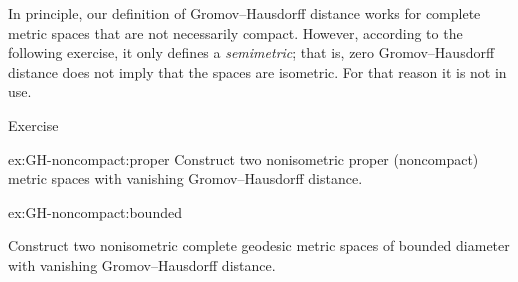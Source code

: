 In principle, our definition of Gromov--Hausdorff distance works for complete metric spaces that are not necessarily compact.
However, according to the following exercise, it only defines a \emph{semimetric}; that is, zero Gromov--Hausdorff distance does not imply that the spaces are isometric.
For that reason it is not in use.

\begin{thm}{Exercise}\label{ex:GH-noncompact}
\begin{subthm}{ex:GH-noncompact:proper}
Construct two nonisometric proper (noncompact) metric spaces with vanishing Gromov--Hausdorff distance.
\end{subthm}

\begin{subthm}{ex:GH-noncompact:bounded}

Construct two nonisometric complete geodesic metric spaces of bounded diameter with vanishing Gromov--Hausdorff distance.
\end{subthm}


\end{thm}
